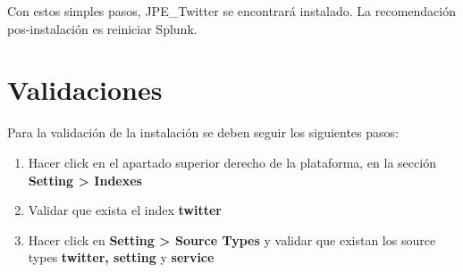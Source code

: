 \documentclass[report]{article}
\begin{document}
Con estos simples pasos, JPE\_Twitter se encontrar\'a instalado. La recomendaci\'on pos-instalaci\'on es reiniciar Splunk.
\newpage
\section{Validaciones}

Para la validaci\'on de la instalaci\'on se deben seguir los siguientes pasos:
\newline

\begin{enumerate}[label=(\alph*)]
\item Hacer click en el apartado superior derecho de la plataforma, en la secci\'on \textbf{Setting > Indexes}
\item Validar que exista el index \textbf{twitter}
\item Hacer click en \textbf{Setting > Source Types} y validar que existan los source types \textbf{twitter, setting} y \textbf{service}
\newline
\end{enumerate}
\end{document}
